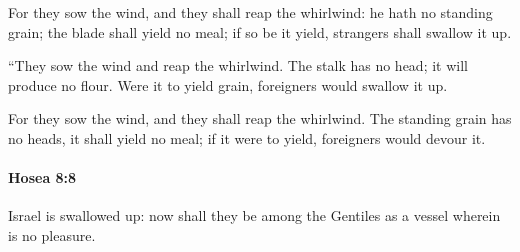			\begin{versebox}
					\item[BHS] 
					\item[LXX] 
					\item[ASV] For they sow the wind, and they shall reap the whirlwind: he hath no standing grain; the blade shall yield no meal; if so be it yield, strangers shall swallow it up.
					\item[NIV] “They sow the wind and reap the whirlwind. The stalk has no head; it will produce no flour. Were it to yield grain, foreigners would swallow it up.
					\item[NRSV] For they sow the wind, and they shall reap the whirlwind. The standing grain has no heads, it shall yield no meal; if it were to yield, foreigners would devour it.
			\end{versebox}

		\paragraph{Hosea 8:8} %
			\label{HOSEA-8-8}

			Israel is swallowed up: now shall they be among the Gentiles as a vessel wherein is no pleasure.

